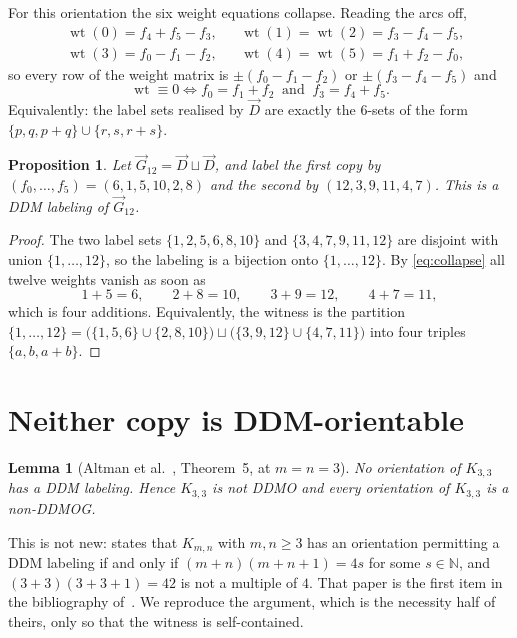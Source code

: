 \documentclass[11pt]{amsart}
\newtheorem{lemma}[theorem]{Lemma}
\newtheorem{proposition}[theorem]{Proposition}
\DeclareMathOperator{\wt}{wt}
\newcommand{\ora}[1]{\overrightarrow{#1}}
\begin{document}
For this orientation the six weight equations collapse. Reading the arcs off,
\begin{align*}
 &\wt(0)=f_4+f_5-f_3, &&\wt(1)=\wt(2)=f_3-f_4-f_5,\\
 &\wt(3)=f_0-f_1-f_2, &&\wt(4)=\wt(5)=f_1+f_2-f_0,
\end{align*}
so every row of the weight matrix is $\pm(f_0-f_1-f_2)$ or $\pm(f_3-f_4-f_5)$ and
\begin{equation}\label{eq:collapse}
 \wt\equiv 0
 \iff
 f_0=f_1+f_2 \ \text{ and }\ f_3=f_4+f_5 .
\end{equation}
Equivalently: the label sets realised by $\ora{D}$ are exactly the $6$-sets of the form
$\{p,q,p+q\}\cup\{r,s,r+s\}$.

\begin{proposition}\label{prop:w12}
Let $\ora{G}_{12}=\ora{D}\sqcup\ora{D}$, and label the first copy by
$(f_0,\dots,f_5)=(6,1,5,10,2,8)$ and the second by $(12,3,9,11,4,7)$. This is a DDM labeling
of $\ora{G}_{12}$.
\end{proposition}

\begin{proof}
The two label sets $\{1,2,5,6,8,10\}$ and $\{3,4,7,9,11,12\}$ are disjoint with union
$\{1,\dots,12\}$, so the labeling is a bijection onto $\{1,\dots,12\}$. By
\eqref{eq:collapse} all twelve weights vanish as soon as
\[
 1+5=6,\qquad 2+8=10,\qquad 3+9=12,\qquad 4+7=11,
\]
which is four additions. Equivalently, the witness is the partition
$\{1,\dots,12\}=\bigl(\{1,5,6\}\cup\{2,8,10\}\bigr)\sqcup\bigl(\{3,9,12\}\cup\{4,7,11\}\bigr)$
into four triples $\{a,b,a+b\}$.
\end{proof}

\section{Neither copy is DDM-orientable}\label{sec:not}

\begin{lemma}[Altman et al.~\cite{Altman}, Theorem~5, at $m=n=3$]\label{lem:k33}
No orientation of $K_{3,3}$ has a DDM labeling. Hence $K_{3,3}$ is not DDMO and every
orientation of $K_{3,3}$ is a non-DDMOG.
\end{lemma}

This is not new: \cite[Theorem~5]{Altman} states that $K_{m,n}$ with $m,n\ge3$ has an
orientation permitting a DDM labeling if and only if $(m+n)(m+n+1)=4s$ for some
$s\in\mathbb{N}$, and $(3+3)(3+3+1)=42$ is not a multiple of $4$. That paper is the first item
in the bibliography of~\cite{Source}. We reproduce the argument, which is the necessity half of
theirs, only so that the witness is self-contained.
\end{document}
